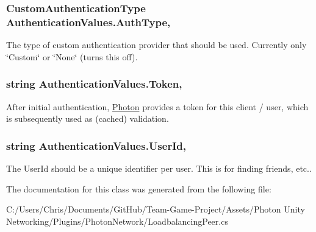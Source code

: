 \subsubsection[{\texorpdfstring{Auth\+Type}{AuthType}}]{\setlength{\rightskip}{0pt plus 5cm}Custom\+Authentication\+Type Authentication\+Values.\+Auth\+Type\hspace{0.3cm}{\ttfamily [get]}, {\ttfamily [set]}}\hypertarget{class_authentication_values_a6902d22f3f59653cac4ee895273ed5c5}{}\label{class_authentication_values_a6902d22f3f59653cac4ee895273ed5c5}


The type of custom authentication provider that should be used. Currently only \char`\"{}\+Custom\char`\"{} or \char`\"{}\+None\char`\"{} (turns this off).

\subsubsection[{\texorpdfstring{Token}{Token}}]{\setlength{\rightskip}{0pt plus 5cm}string Authentication\+Values.\+Token\hspace{0.3cm}{\ttfamily [get]}, {\ttfamily [set]}}\hypertarget{class_authentication_values_a0fa90664bfe590fec56cf4f399ff26b2}{}\label{class_authentication_values_a0fa90664bfe590fec56cf4f399ff26b2}


After initial authentication, \hyperlink{namespace_photon}{Photon} provides a token for this client / user, which is subsequently used as (cached) validation.

\subsubsection[{\texorpdfstring{User\+Id}{UserId}}]{\setlength{\rightskip}{0pt plus 5cm}string Authentication\+Values.\+User\+Id\hspace{0.3cm}{\ttfamily [get]}, {\ttfamily [set]}}\hypertarget{class_authentication_values_a60a4d92454c4b2bbca1f299631da2f94}{}\label{class_authentication_values_a60a4d92454c4b2bbca1f299631da2f94}


The User\+Id should be a unique identifier per user. This is for finding friends, etc..



The documentation for this class was generated from the following file\+:\begin{DoxyCompactItemize}
\item 
C\+:/\+Users/\+Chris/\+Documents/\+Git\+Hub/\+Team-\/\+Game-\/\+Project/\+Assets/\+Photon Unity Networking/\+Plugins/\+Photon\+Network/Loadbalancing\+Peer.\+cs\end{DoxyCompactItemize}
